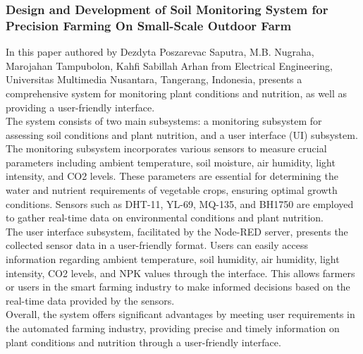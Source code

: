 \documentclass[12pt, a4paper]{article}
\begin{document}
\subsubsection{Design and Development of Soil Monitoring System for Precision Farming On Small-Scale Outdoor Farm}
In this paper authored by Dezdyta Poszarevac Saputra, M.B. Nugraha, Marojahan Tampubolon, Kahfi Sabillah Arhan \cite{10435334} from Electrical Engineering, Universitas Multimedia Nusantara, Tangerang, Indonesia, presents a comprehensive system for monitoring plant conditions and nutrition, as well as providing a user-friendly interface.\\
The system consists of two main subsystems: a monitoring subsystem for assessing soil conditions and plant nutrition, and a user interface (UI) subsystem.\\
The monitoring subsystem incorporates various sensors to measure crucial parameters including ambient temperature, soil moisture, air humidity, light intensity, and CO2 levels. These parameters are essential for determining the water and nutrient requirements of vegetable crops, ensuring optimal growth conditions. Sensors such as DHT-11, YL-69, MQ-135, and BH1750 are employed to gather real-time data on environmental conditions and plant nutrition.\\
The user interface subsystem, facilitated by the Node-RED server, presents the collected sensor data in a user-friendly format. Users can easily access information regarding ambient temperature, soil humidity, air humidity, light intensity, CO2 levels, and NPK values through the interface. This allows farmers or users in the smart farming industry to make informed decisions based on the real-time data provided by the sensors.\\
Overall, the system offers significant advantages by meeting user requirements in the automated farming industry, providing precise and timely information on plant conditions and nutrition through a user-friendly interface.
\end{document}
